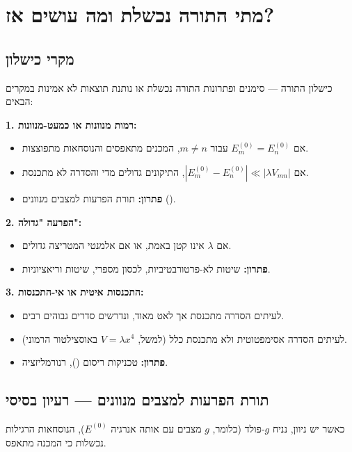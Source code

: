 \section{מתי התורה נכשלת ומה עושים אז?}

\subsection{מקרי כישלון}

\begin{notebox}{כישלון התורה — סימנים ופתרונות}
התורה נכשלת או נותנת תוצאות לא אמינות במקרים הבאים:

\textbf{1. רמות מנוונות או כמעט-מנוונות:}
\begin{itemize}
\item אם $E_m^{(0)} = E_n^{(0)}$ עבור $m \neq n$, המכנים מתאפסים והנוסחאות מתפוצצות.
\item אם $|E_m^{(0)} - E_n^{(0)}| \ll |\lambda V_{mn}|$, התיקונים גדולים מדי והסדרה לא מתכנסת.
\item \textbf{פתרון:} תורת הפרעות למצבים מנוונים ().
\end{itemize}

\textbf{2. הפרעה "גדולה":}
\begin{itemize}
\item אם $\lambda$ אינו קטן באמת, או אם אלמנטי המטריצה גדולים.
\item \textbf{פתרון:} שיטות לא-פרטורבטיביות, לכסון מספרי, שיטות וריאציוניות.
\end{itemize}

\textbf{3. התכנסות איטית או אי-התכנסות:}
\begin{itemize}
\item לעיתים הסדרה מתכנסת אך לאט מאוד, ונדרשים סדרים גבוהים רבים.
\item לעיתים הסדרה אסימפטוטית ולא מתכנסת כלל (למשל, $V = \lambda x^4$ באוסצילטור הרמוני).
\item \textbf{פתרון:} טכניקות ריסום (), רנורמליזציה.
\end{itemize}
\end{notebox}

\subsection{תורת הפרעות למצבים מנוונים — רעיון בסיסי}

כאשר יש ניוון, נניח $g$-פולד (כלומר, $g$ מצבים עם אותה אנרגיה $E^{(0)}$), הנוסחאות הרגילות נכשלות כי המכנה מתאפס.

